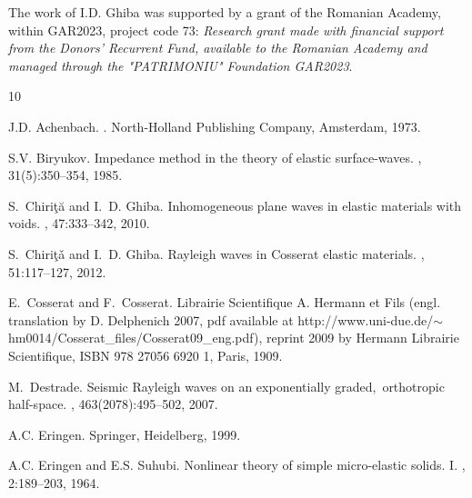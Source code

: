 \documentclass[10pt]{article}
\begin{document}
\begin{footnotesize}
	 The  work of I.D. Ghiba  was supported by a grant of the Romanian Academy,  within GAR2023, project code 73: {\it Research grant made with financial support from the Donors' Recurrent Fund, available to the Romanian Academy and managed through the "PATRIMONIU" Foundation GAR2023}.
	


	

	


\begin{thebibliography}{10}
	
	J.D. Achenbach.
	.
	\newblock North-Holland Publishing Company, Amsterdam, 1973.
	
	S.V. Biryukov.
	\newblock Impedance method in the theory of elastic surface-waves.
	, 31(5):350--354, 1985.
	
	S.~Chiri{\c t}{\u a} and I.~D. Ghiba.
	\newblock Inhomogeneous plane waves in elastic materials with voids.
	, 47:333--342, 2010.
	
	S.~Chiri{\c t}{\v a} and I.~D. Ghiba.
	\newblock Rayleigh waves in {Cosserat} elastic materials.
	, 51:117--127, 2012.
	
	E.~Cosserat and F.~Cosserat.
	\newblock Librairie Scientifique A. Hermann et Fils (engl. translation by D.
	Delphenich 2007, pdf available at
	{http://www.uni-due.de/$\sim$hm0014/Cosserat\_files/Cosserat09\_eng.pdf}),
	reprint 2009 by Hermann Librairie Scientifique, ISBN 978 27056 6920 1, Paris,
	1909.
	
	M.~Destrade.
	\newblock Seismic {Rayleigh} waves on an exponentially graded,~orthotropic
	half-space.
	,
	463(2078):495--502, 2007.
	
	A.C. Eringen.
	\newblock Springer, Heidelberg, 1999.
	
	A.C. Eringen and E.S. Suhubi.
	\newblock Nonlinear theory of simple micro-elastic solids. {I}.
	, 2:189--203, 1964.
	

\end{thebibliography}
\end{footnotesize}
\end{document}
